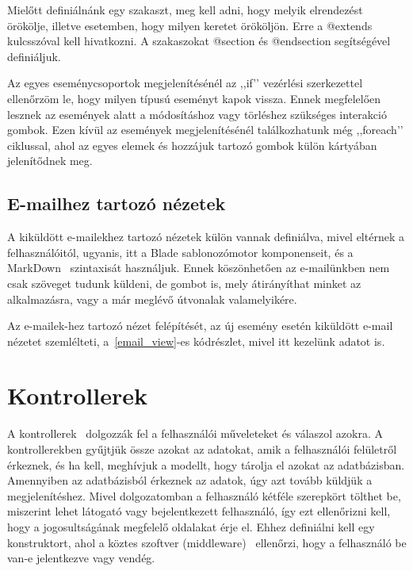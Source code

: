 \documentclass[
]{thesis-ekf}
\theoremstyle{definition}
\theoremstyle{remark}
\begin{document}
	Mielőtt definiálnánk egy szakaszt, meg kell adni, hogy melyik elrendezést örökölje, illetve esetemben, hogy milyen keretet örököljön. Erre a @extends kulcsszóval kell hivatkozni. A szakaszokat @section és @endsection segítségével definiáljuk.
	
	Az egyes eseménycsoportok megjelenítésénél az ,,if’’ vezérlési szerkezettel ellenőrzöm le, hogy milyen típusú eseményt kapok vissza. Ennek megfelelően lesznek az események alatt a módosításhoz vagy törléshez szükséges interakció gombok. Ezen kívül az események megjelenítésénél találkozhatunk még ,,foreach’’ ciklussal, ahol az egyes elemek és hozzájuk tartozó gombok külön kártyában jelenítődnek meg. 
	
	\subsection{E-mailhez tartozó nézetek}
	A kiküldött e-mailekhez tartozó nézetek külön vannak definiálva, mivel eltérnek a felhasználóitól, ugyanis, itt a Blade sablonozómotor komponenseit, és a MarkDown~\cite{markdown_page} szintaxisát használjuk. Ennek köszönhetően az e-mailünkben nem csak szöveget tudunk küldeni, de gombot is, mely átirányíthat minket az alkalmazásra, vagy a már meglévő útvonalak valamelyikére.
	
	Az e-mailek-hez tartozó nézet felépítését, az új esemény esetén kiküldött e-mail nézetet szemlélteti, a~\ref{email_view}-es kódrészlet, mivel itt kezelünk adatot is. 
	
	
	
	\section{Kontrollerek}
	A kontrollerek~\cite{laravel_controller} dolgozzák fel a felhasználói műveleteket és válaszol azokra. A kontrollerekben gyűjtjük össze azokat az adatokat, amik a felhasználói felületről érkeznek, és ha kell, meghívjuk a modellt, hogy tárolja el azokat az adatbázisban. Amennyiben az adatbázisból érkeznek az adatok, úgy azt tovább küldjük a megjelenítéshez. Mivel dolgozatomban a felhasználó kétféle szerepkört tölthet be, miszerint lehet látogató vagy bejelentkezett felhasználó, így ezt ellenőrizni kell, hogy a jogosultságának megfelelő oldalakat érje el. Ehhez definiálni kell egy konstruktort, ahol a köztes szoftver (middleware)~\cite{laravel_middlewear} ellenőrzi, hogy a felhasználó be van-e jelentkezve vagy vendég.
	
\end{document}
